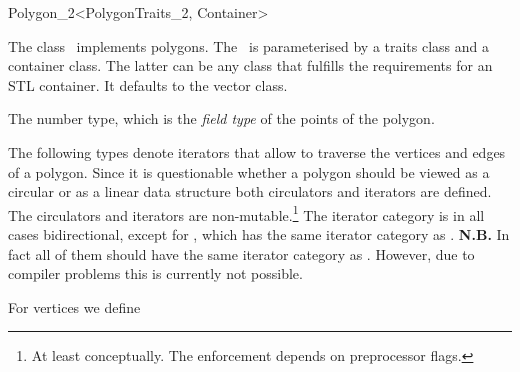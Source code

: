 

\begin{ccRefClass}{Polygon_2<PolygonTraits_2, Container>}


\ccDefinition
  
The class \ccRefName\ implements polygons.
The \ccRefName\ is parameterised by a traits class and a container class.
The latter can be any class that fulfills the requirements for an STL container.
It defaults to the vector class.




\ccTypes
{}
\ccGlue
{}

{The number type, which is the {\em field type} of the points of the polygon.} 
\ccGlue
{}
\ccGlue
{}

The following types denote iterators that allow to traverse the vertices and
edges of a polygon. 
Since it is questionable whether a polygon should be viewed as a circular or 
as a linear data structure both circulators and iterators are defined.
The circulators and iterators are non-mutable.\footnote{At least conceptually.
The enforcement depends on preprocessor flags.}
The iterator category is in all cases bidirectional, except for
, which has the
same iterator category as .
{\bf N.B.} In fact all of them should have the same iterator category as
. However, due to compiler problems this is currently
not possible.

For vertices we define


\end{ccRefClass}
